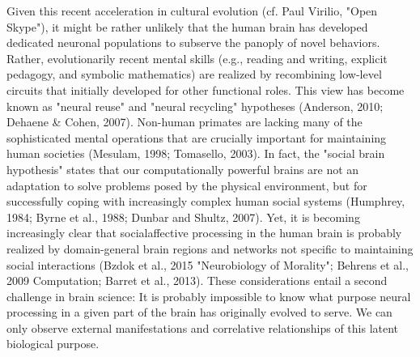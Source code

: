\documentclass[authoryear,review,3p]{elsarticle}
\begin{document}
Given this recent acceleration in cultural evolution
(cf. Paul Virilio, "Open Skype"),
it might be
rather unlikely that the human brain has developed dedicated
neuronal populations to subserve the panoply of novel behaviors.
Rather, evolutionarily recent mental skills
(e.g., reading and writing, explicit pedagogy, and
symbolic mathematics)
are realized by recombining low-level circuits that initially
developed for other functional roles.
This view has become known as
"neural reuse" and "neural recycling" hypotheses
(Anderson, 2010; Dehaene \& Cohen, 2007).
Non-human primates are lacking many of the sophisticated
mental operations that
are crucially important for maintaining human societies
(Mesulam, 1998; Tomasello, 2003).
In fact,
the "social brain hypothesis" states that our
computationally powerful brains are not an adaptation to
solve problems posed by the physical environment,
but for successfully coping with increasingly complex human social systems
(Humphrey, 1984; Byrne et al., 1988; Dunbar and Shultz, 2007).
Yet, it is becoming increasingly clear that socialaffective processing
in the human brain is probably realized by domain-general
brain regions and networks not specific to maintaining social interactions
(Bzdok et al., 2015 "Neurobiology of Morality"; Behrens et al., 2009 Computation;
Barret et al., 2013).
These considerations entail a second challenge in brain science:
It is probably impossible to know what purpose neural
processing in a given part of the brain has originally evolved to serve.
We can only observe external manifestations and correlative relationships of
this latent biological purpose.
\end{document}

